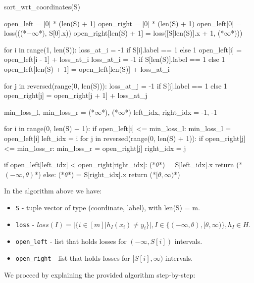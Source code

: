 \documentclass{article}
\newcommand{\<}{\langle}
\renewcommand{\>}{\rangle}
\theoremstyle{definition}
\begin{document}
\begin{mylisting}
sort_wrt_coordinates(S)

open_left = [0] * (len(S) + 1) 
open_right = [0] * (len(S) + 1)
open_left[0] = loss(((*$-\infty$*), S[0].x))
open_right[len(S) + 1] = loss([S[len(S)].x + 1, (*$\infty$*)))

for i in range(1, len(S)):
    loss_at_i = -1 if S[i].label == 1 else 1
    open_left[i] = open_left[i - 1] + loss_at_i
loss_at_i = -1 if S[len(S)].label == 1 else 1
open_left[len(S) + 1] = open_left[len(S)] + loss_at_i

for j in reversed(range(0, len(S))):
    loss_at_j = -1 if S[j].label == 1 else 1
    open_right[j] = open_right[j + 1] + loss_at_j

min_loss_l, min_loss_r = (*$\infty$*), (*$\infty$*)
left_idx, right_idx = -1, -1

for i in range(0, len(S) + 1):
    if open_left[i] <= min_loss_l:
        min_loss_l = open_left[i]
        left_idx = i
for j in reversed(range(0, len(S) + 1)):
    if open_right[j] <= min_loss_r:
        min_loss_r = open_right[j]
        right_idx = j

if open_left[left_idx] < open_right[right_idx]:
    (*$\theta$*) = S[left_idx].x
    return (*$(-\infty, \theta)$*)
else:
    (*$\theta$*) = S[right_idx].x
    return (*$[\theta, \infty)$*)
\end{mylisting}

In the algorithm above we have:

\begin{itemize}
    \item \texttt{S} - tuple vector of type (coordinate, label), with len(S) = m.
    \item \texttt{loss} - $loss(I) = |\{i \in [m] | h_I(x_i) \neq y_i\}|, I \in \{(-\infty, \theta), [\theta, \infty)\}, h_I \in H$.
    \item \texttt{open\_left} - list that holds losses for $(-\infty, S[i])$ intervals.
    \item \texttt{open\_right} - list that holds losses for $[S[i], \infty)$ intervals.
\end{itemize}

We proceed by explaining the provided algorithm step-by-step:
\end{document}
